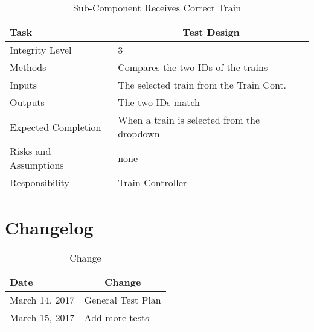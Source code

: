 \documentclass[]{article}
\begin{document}
\begin{table}[H]
	\centering
	\caption{Sub-Component Receives Correct Train}
	\begin{tabular}{|l|l|}
		\hline
		Task & \multicolumn{1}{c|}{Test Design} \\ \hline
		Integrity Level & 3 \\ \hline
		Methods & Compares the two IDs of the trains\\ \hline
		Inputs & The selected train from the Train Cont.\\ \hline
		Outputs & The two IDs match \\ \hline
		Expected Completion & When a train is selected from the dropdown\\ \hline
		Risks and Assumptions & none \\ \hline
		Responsibility & Train Controller\\ \hline
	\end{tabular}
\end{table}

\section{Changelog}

\begin{table}[H]
	\centering
	\caption{Change}
	\label{changelogl}
	\begin{tabular}{|l|l|}
		\hline
		Date & \multicolumn{1}{c|}{Change} \\ \hline
		March 14, 2017 & General Test Plan \\ \hline
		March 15, 2017 & Add more tests \\ \hline
	\end{tabular}
\end{table}
\end{document}
